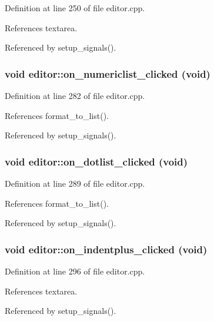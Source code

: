 Definition at line 250 of file editor.cpp.

References textarea.

Referenced by setup\_\-signals().
\subsubsection{\setlength{\rightskip}{0pt plus 5cm}void editor::on\_\-numericlist\_\-clicked (void)\hspace{0.3cm}{\tt  [private, slot]}}\label{classeditor_d380e96950128ea7c6f23dc527be9baa}




Definition at line 282 of file editor.cpp.

References format\_\-to\_\-list().

Referenced by setup\_\-signals().
\subsubsection{\setlength{\rightskip}{0pt plus 5cm}void editor::on\_\-dotlist\_\-clicked (void)\hspace{0.3cm}{\tt  [private, slot]}}\label{classeditor_3227cb19825b4ba137bd9af1029d859f}




Definition at line 289 of file editor.cpp.

References format\_\-to\_\-list().

Referenced by setup\_\-signals().
\subsubsection{\setlength{\rightskip}{0pt plus 5cm}void editor::on\_\-indentplus\_\-clicked (void)\hspace{0.3cm}{\tt  [private, slot]}}\label{classeditor_e6c6ddf82cb30dd9ab8dee71ffc6e8c7}




Definition at line 296 of file editor.cpp.

References textarea.

Referenced by setup\_\-signals().
